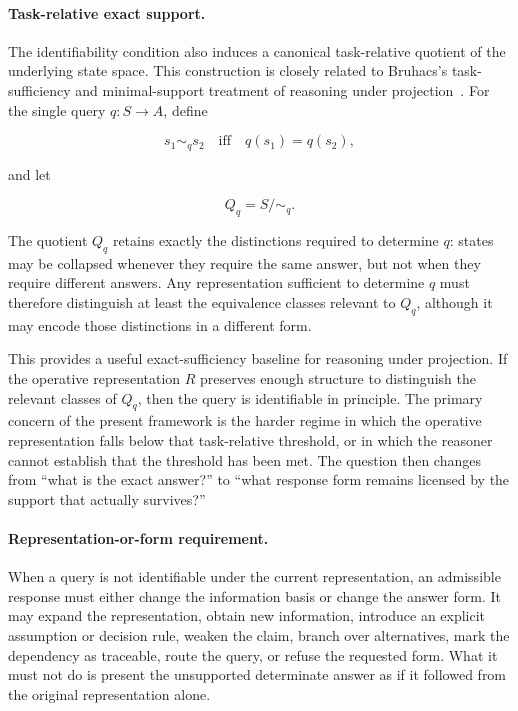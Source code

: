 \documentclass[11pt]{article}
\begin{document}
\paragraph{Task-relative exact support.}
The identifiability condition also induces a canonical task-relative quotient of the underlying state space. This construction is closely related to Bruhacs's task-sufficiency and minimal-support treatment of reasoning under projection~\cite{Bruhacs2026Projection}. For the single query \(q:S\rightarrow A\), define

\[
s_1\sim_q s_2
\quad\text{iff}\quad
q(s_1)=q(s_2),
\]

and let

\[
Q_q=S/{\sim_q}.
\]

The quotient \(Q_q\) retains exactly the distinctions required to determine \(q\): states may be collapsed whenever they require the same answer, but not when they require different answers. Any representation sufficient to determine \(q\) must therefore distinguish at least the equivalence classes relevant to \(Q_q\), although it may encode those distinctions in a different form.

This provides a useful exact-sufficiency baseline for reasoning under projection. If the operative representation \(R\) preserves enough structure to distinguish the relevant classes of \(Q_q\), then the query is identifiable in principle. The primary concern of the present framework is the harder regime in which the operative representation falls below that task-relative threshold, or in which the reasoner cannot establish that the threshold has been met. The question then changes from ``what is the exact answer?'' to ``what response form remains licensed by the support that actually survives?''

\paragraph{Representation-or-form requirement.}
When a query is not identifiable under the current representation, an admissible response must either change the information basis or change the answer form. It may expand the representation, obtain new information, introduce an explicit assumption or decision rule, weaken the claim, branch over alternatives, mark the dependency as traceable, route the query, or refuse the requested form. What it must not do is present the unsupported determinate answer as if it followed from the original representation alone.
\end{document}
